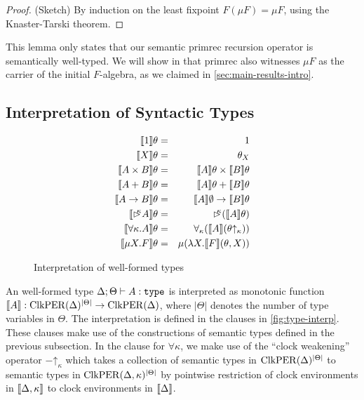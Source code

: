 \begin{proof}
  (Sketch) By induction on the least fixpoint $F(\mu F) = \mu F$,
  using the Knaster-Tarski theorem.
\end{proof}

This lemma only states that our semantic $\mathrm{primrec}$ recursion
operator is semantically well-typed. We will show in
 that $\mathrm{primrec}$ also witnesses
$\mu F$ as the carrier of the initial $F$-algebra, as we claimed in
\autoref{sec:main-results-intro}.

\subsection{Interpretation of Syntactic Types}\label{sec:type-interp}

\begin{figure}[t]
  \centering
  \begin{eqnarray*}
    \llbracket 1 \rrbracket\theta & = & 1 \\
    \llbracket X \rrbracket\theta & = & \theta_X \\
    \llbracket A \times B \rrbracket\theta & = & \llbracket A \rrbracket\theta \times \llbracket B \rrbracket\theta \\
    \llbracket A + B \rrbracket\theta & = & \llbracket A \rrbracket\theta + \llbracket B \rrbracket\theta \\
    \llbracket A \to B \rrbracket\theta & = & \llbracket A \rrbracket\emptyset \to \llbracket B \rrbracket\theta \\
    \llbracket \mathord{\rhd\kern-0.4em^{\kappa}} A \rrbracket\theta & = & \mathord{\rhd\kern-0.4em^{\kappa}} (\llbracket A \rrbracket\theta) \\
    \llbracket \forall \kappa. A \rrbracket\theta & = & \forall_\kappa (\llbracket A \rrbracket(\theta\mathord\uparrow_\kappa)) \\
    \llbracket \mu X. F \rrbracket\theta & = & \mu (\lambda X. \llbracket F \rrbracket(\theta, X))
  \end{eqnarray*}
  \caption{Interpretation of well-formed types}
  \label{fig:type-interp}
\end{figure}

An well-formed type $\Delta; \Theta \vdash A : \texttt{\textup{type}}$ is
interpreted as monotonic function $\llbracket A \rrbracket :
\mathrm{ClkPER}(\Delta)^{|\Theta|} \to \mathrm{ClkPER}(\Delta)$, where $|\Theta|$
denotes the number of type variables in $\Theta$. The interpretation
is defined in the clauses in \autoref{fig:type-interp}. These clauses
make use of the constructions of semantic types defined in the
previous subsection. In the clause for $\forall \kappa$, we make use
of the ``clock weakening'' operator $-\mathord\uparrow_\kappa$ which
takes a collection of semantic types in $\mathrm{ClkPER}(\Delta)^{|\Theta|}$
to semantic types in $\mathrm{ClkPER}(\Delta,\kappa)^{|\Theta|}$ by pointwise
restriction of clock environments in $\llbracket \Delta, \kappa \rrbracket$ to clock
environments in $\llbracket \Delta \rrbracket$.

